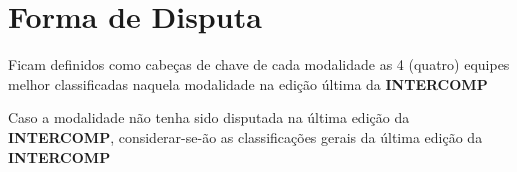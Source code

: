 {\let\clearpage\relax \chapter{Forma de Disputa}}

\begin{article}
	\label{art:cabecas}
	Ficam definidos como cabeças de chave de cada modalidade as 4 (quatro) equipes melhor classificadas naquela modalidade na edição última da \textbf{INTERCOMP}

	\begin{xparagraph}
		Caso a modalidade não tenha sido disputada na última edição da \textbf{INTERCOMP}, considerar-se-ão as classificações gerais da última edição da \textbf{INTERCOMP}
	\end{xparagraph}
\end{article}


